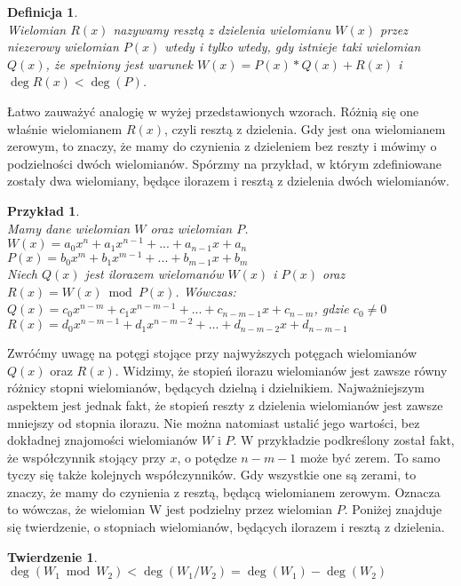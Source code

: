 \documentclass[twoside,a4paper]{book}
\newtheorem{theorem}{Twierdzenie}
\newtheorem{definition}{Definicja}
\newtheorem{example}{Przykład}
\begin{document}
\begin{definition}
	$ $\\
	Wielomian $R(x)$ nazywamy resztą z dzielenia wielomianu $W(x)$ przez niezerowy wielomian $P(x)$ wtedy i tylko wtedy, gdy istnieje taki wielomian $Q(x)$, że spełniony jest warunek $W(x) = P(x) * Q(x) + R(x)$ i $\deg R(x) < \deg(P)$.
\end{definition}

Łatwo zauważyć analogię w wyżej przedstawionych wzorach. Różnią się one właśnie wielomianem $R(x)$, czyli resztą z dzielenia. Gdy jest ona wielomianem zerowym, to znaczy, że mamy do czynienia z dzieleniem bez reszty i mówimy o podzielności dwóch wielomianów. Spórzmy na przykład, w którym zdefiniowane zostały dwa wielomiany, będące ilorazem i resztą z dzielenia dwóch wielomianów.

\begin{example}
	$ $\\
	Mamy dane wielomian $W$ oraz wielomian $P$. \\
	$W(x) = a_0x^n + a_1x^{n-1} + ... + a_{n-1}x + a_n$ \\
	$P(x) = b_0x^m + b_1x^{m-1} + ... + b_{m-1}x + b_m$ \\
	Niech $Q(x)$ jest ilorazem wielomanów $W(x)$ i $P(x)$ oraz $R(x) = W(x)\bmod P(x)$. Wówczas: \\
	$Q(x) = c_0x^{n-m} + c_1x^{n-m-1} + ... + c_{n-m-1}x + c_{n-m}$, gdzie $c_0\ne 0$ \\
	$R(x) = d_0x^{n-m-1} + d_1x^{n-m-2} + ... + d_{n-m-2}x + d_{n-m-1}$
\end{example}

Zwróćmy uwagę na potęgi stojące przy najwyższych potęgach wielomianów $Q(x)$ oraz $R(x)$. Widzimy, że stopień ilorazu wielomianów jest zawsze równy różnicy stopni wielomianów, będących dzielną i dzielnikiem. Najważniejszym aspektem jest jednak fakt, że stopień reszty z dzielenia wielomianów jest zawsze mniejszy od stopnia ilorazu. Nie można natomiast ustalić jego wartości, bez dokładnej znajomości wielomianów $W$ i $P$. W przykładzie podkreślony został fakt, że współczynnik stojący przy $x$, o potędze $n-m-1$ może być zerem. To samo tyczy się także kolejnych współczynników. Gdy wszystkie one są zerami, to znaczy, że mamy do czynienia z resztą, będącą wielomianem zerowym. Oznacza to wówczas, że wielomian W jest podzielny przez wielomian $P$. Poniżej znajduje się twierdzenie, o stopniach wielomianów, będących ilorazem i resztą z dzielenia.

\begin{theorem}
$ $\\
$\deg(W_1 \bmod W_2) < \deg(W_1 / W_2) = \deg(W_1) - \deg(W_2)$
\end{theorem}
\end{document}
